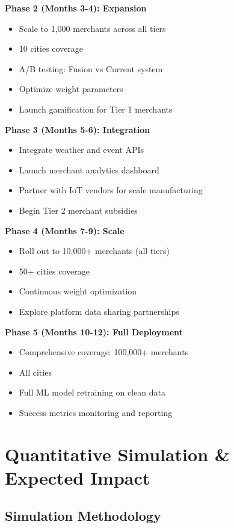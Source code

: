 \documentclass[11pt,a4paper]{article}
\begin{document}
\textbf{Phase 2 (Months 3-4): Expansion}
\begin{itemize}[leftmargin=*]
    \item Scale to 1,000 merchants across all tiers
    \item 10 cities coverage
    \item A/B testing: Fusion vs Current system
    \item Optimize weight parameters
    \item Launch gamification for Tier 1 merchants
\end{itemize}

\textbf{Phase 3 (Months 5-6): Integration}
\begin{itemize}[leftmargin=*]
    \item Integrate weather and event APIs
    \item Launch merchant analytics dashboard
    \item Partner with IoT vendors for scale manufacturing
    \item Begin Tier 2 merchant subsidies
\end{itemize}

\textbf{Phase 4 (Months 7-9): Scale}
\begin{itemize}[leftmargin=*]
    \item Roll out to 10,000+ merchants (all tiers)
    \item 50+ cities coverage
    \item Continuous weight optimization
    \item Explore platform data sharing partnerships
\end{itemize}

\textbf{Phase 5 (Months 10-12): Full Deployment}
\begin{itemize}[leftmargin=*]
    \item Comprehensive coverage: 100,000+ merchants
    \item All cities
    \item Full ML model retraining on clean data
    \item Success metrics monitoring and reporting
\end{itemize}

\newpage

\section{Quantitative Simulation \& Expected Impact}

\subsection{Simulation Methodology}
\end{document}
